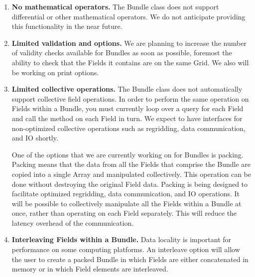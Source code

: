 
\label{sec:bundlerest}

\begin{enumerate}
\item{\bf No mathematical operators.}
The Bundle class does not support differential or other
mathematical operators.  We do not anticipate providing this 
functionality in the near future.

\item{\bf Limited validation and options.}
We are planning to increase the number of validity checks available
for Bundles as soon as possible, foremost the ability to check 
that the Fields it contains are on the same Grid.  We also will
be working on print options.

\item{\bf Limited collective operations.}
The Bundle class does not automatically support collective field 
operations.  In order to perform the same operation on Fields within
a Bundle, you must currently loop over a query for each Field and
call the method on each Field in turn.  We expect to have 
interfaces for non-optimized collective operations such as 
regridding, data communication, and IO shortly.

One of the options that we are currently working on for Bundles is
packing.  Packing means that the data from all the
Fields that comprise the Bundle are copied into a single Array and
manipulated collectively.  This operation can be done without 
destroying the original Field data.  Packing is being designed to 
facilitate optimized regridding, data communication, and IO operations.  
It will be possible to collectively manipulate all the Fields within 
a Bundle at once, rather than operating on each Field separately.  
This will reduce the latency overhead of the communication.  

\item{\bf Interleaving Fields within a Bundle.}
Data locality is important for performance on some computing
platforms.  An interleave option will allow the user to create
a packed Bundle in which Fields are either concatenated in memory
or in which Field elements are interleaved.

\end{enumerate}




